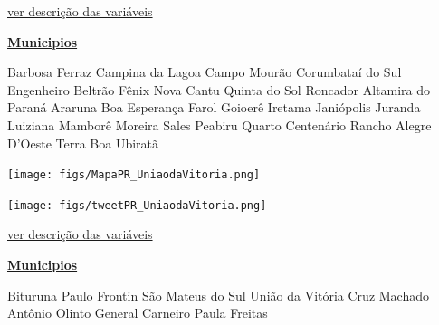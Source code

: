 \documentclass[10pt]{article} %
\begin{document}
\begin{minipage}[t]{.66\linewidth}
\begin{center}

\end{center}
\small{\hyperlink{vartab}{ver descrição das variáveis}}\end{minipage}\hfill\begin{minipage}[t]{.30\linewidth}
\begin{mdframed}[style=sidebar,frametitle={}]
\textbf{\hyperlink{municips}{Municipios}}\begin{itemize}\gsquare Barbosa Ferraz 
\gsquare Campina da Lagoa 
\gsquare Campo Mourão 
\gsquare Corumbataí do Sul 
\gsquare Engenheiro Beltrão 
\gsquare Fênix 
\gsquare Nova Cantu 
\gsquare Quinta do Sol 
\gsquare Roncador 
\gsquare Altamira do Paraná 
\gsquare Araruna 
\gsquare Boa Esperança 
\gsquare Farol 
\gsquare Goioerê 
\gsquare Iretama 
\gsquare Janiópolis 
\gsquare Juranda 
\gsquare Luiziana 
\gsquare Mamborê 
\gsquare Moreira Sales 
\gsquare Peabiru 
\gsquare Quarto Centenário 
\gsquare Rancho Alegre D'Oeste 
\gsquare Terra Boa 
\gsquare Ubiratã 
\end{itemize}\BackToContents\end{mdframed}\hfill\end{minipage}\newpage\begin{minipage}[t]{.66\linewidth}
\hypertarget{UndV}{}
\texttt{[image: figs/MapaPR\_UniaodaVitoria.png]}\vspace{0.5cm}\vspace{0.5cm}\begin{center}
\texttt{[image: figs/tweetPR\_UniaodaVitoria.png]}\end{center}
\begin{center}

\end{center}
\small{\hyperlink{vartab}{ver descrição das variáveis}}\end{minipage}\hfill\begin{minipage}[t]{.30\linewidth}
\begin{mdframed}[style=sidebar,frametitle={}]
\textbf{\hyperlink{municips}{Municipios}}\begin{itemize}\gsquare Bituruna 
\gsquare Paulo Frontin 
\gsquare São Mateus do Sul 
\gsquare União da Vitória 
\gsquare Cruz Machado 
\gsquare Antônio Olinto 
\gsquare General Carneiro 
\gsquare Paula Freitas 

\end{itemize}
\end{mdframed}
\end{minipage}
\end{document}
